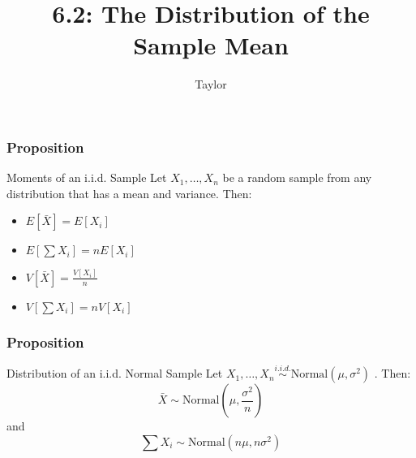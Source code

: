 \documentclass{beamer}
\title["6.2"]{6.2: The Distribution of the Sample Mean}
\author{Taylor}
\institute[UVA] 
{
University of Virginia \\ 
\medskip
\textit{} 
}
\date{}
\begin{document}

\begin{frame}
\titlepage 
\end{frame}

\begin{frame}
\frametitle{Proposition}

\begin{block}{Moments of an i.i.d. Sample}
Let $X_1, \ldots, X_n$ be a random sample from any distribution that has a mean and variance. Then:
\begin{itemize}
\item $E[\bar{X}] = E[X_i]$
\item $E[\sum X_i] = n E[X_i]$
\item $V[\bar{X}] = \frac{V[X_i]}{n}$
\item $V[\sum X_i] = n V[X_i]$
\end{itemize}
\end{block}


\end{frame}

\begin{frame}
\frametitle{Proposition}

\begin{block}{Distribution of an i.i.d. Normal Sample}
Let $X_1, \ldots, X_n \overset{i.i.d.}{\sim} \text{Normal}(\mu, \sigma^2)$ . Then:
\[
\bar{X} \sim \text{Normal}(\mu, \frac{\sigma^2}{n})
\]
and
\[
\sum X_i \sim \text{Normal}(n\mu, n \sigma^2)
\]
\end{block}

\end{frame}
\end{document}
